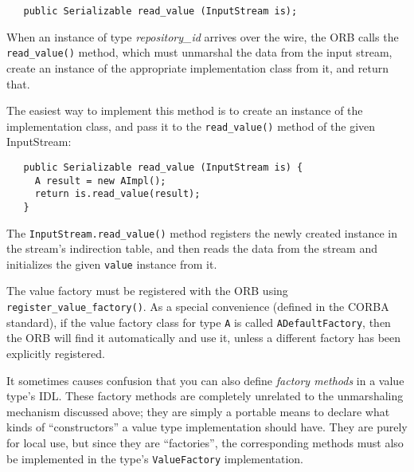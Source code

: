 \begin{verbatim}
   public Serializable read_value (InputStream is);
\end{verbatim}

When an instance of type \emph{repository\_id} arrives over the wire,
the ORB calls the {\tt read\_value()} method, which must unmarshal the
data from the input stream, create an instance of the appropriate
implementation class from it, and return that.

The easiest way to implement this method is to create an instance of
the implementation class, and pass it to the {\tt read\_value()} method
of the given InputStream:

\begin{verbatim}
   public Serializable read_value (InputStream is) {
     A result = new AImpl();
     return is.read_value(result);
   }
\end{verbatim}

The {\tt InputStream.read\_value()} method registers the newly created
instance in the stream's indirection table, and then reads the data
from the stream and initializes the given {\tt value} instance from
it.

The value factory must be registered with the ORB using {\tt
 register\_value\_factory()}.  As a special convenience (defined in
 the CORBA standard), if the value factory class for type {\tt A} is
 called {\tt ADefaultFactory}, then the ORB will find it automatically
 and use it, unless a different factory has been explicitly
 registered.

It sometimes causes confusion that you can also define \emph{factory
methods} in a value type's IDL.  These factory methods are completely
unrelated to the unmarshaling mechanism discussed above; they are
simply a portable means to declare what kinds of ``constructors'' a
value type implementation should have.  They are purely for local use,
but since they are ``factories'', the corresponding methods must also
be implemented in the type's {\tt ValueFactory} implementation.


